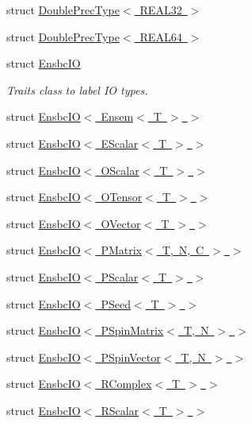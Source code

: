 \begin{DoxyCompactItemize}
struct \mbox{\hyperlink{structENSEM_1_1DoublePrecType_3_01REAL32_01_4}{Double\+Prec\+Type$<$ R\+E\+A\+L32 $>$}}
\item 
struct \mbox{\hyperlink{structENSEM_1_1DoublePrecType_3_01REAL64_01_4}{Double\+Prec\+Type$<$ R\+E\+A\+L64 $>$}}
\item 
struct \mbox{\hyperlink{structENSEM_1_1EnsbcIO}{Ensbc\+IO}}
\begin{DoxyCompactList}\small\item\em Traits class to label IO types. \end{DoxyCompactList}\item 
struct \mbox{\hyperlink{structENSEM_1_1EnsbcIO_3_01Ensem_3_01T_01_4_01_4}{Ensbc\+I\+O$<$ Ensem$<$ T $>$ $>$}}
\item 
struct \mbox{\hyperlink{structENSEM_1_1EnsbcIO_3_01EScalar_3_01T_01_4_01_4}{Ensbc\+I\+O$<$ E\+Scalar$<$ T $>$ $>$}}
\item 
struct \mbox{\hyperlink{structENSEM_1_1EnsbcIO_3_01OScalar_3_01T_01_4_01_4}{Ensbc\+I\+O$<$ O\+Scalar$<$ T $>$ $>$}}
\item 
struct \mbox{\hyperlink{structENSEM_1_1EnsbcIO_3_01OTensor_3_01T_01_4_01_4}{Ensbc\+I\+O$<$ O\+Tensor$<$ T $>$ $>$}}
\item 
struct \mbox{\hyperlink{structENSEM_1_1EnsbcIO_3_01OVector_3_01T_01_4_01_4}{Ensbc\+I\+O$<$ O\+Vector$<$ T $>$ $>$}}
\item 
struct \mbox{\hyperlink{structENSEM_1_1EnsbcIO_3_01PMatrix_3_01T_00_01N_00_01C_01_4_01_4}{Ensbc\+I\+O$<$ P\+Matrix$<$ T, N, C $>$ $>$}}
\item 
struct \mbox{\hyperlink{structENSEM_1_1EnsbcIO_3_01PScalar_3_01T_01_4_01_4}{Ensbc\+I\+O$<$ P\+Scalar$<$ T $>$ $>$}}
\item 
struct \mbox{\hyperlink{structENSEM_1_1EnsbcIO_3_01PSeed_3_01T_01_4_01_4}{Ensbc\+I\+O$<$ P\+Seed$<$ T $>$ $>$}}
\item 
struct \mbox{\hyperlink{structENSEM_1_1EnsbcIO_3_01PSpinMatrix_3_01T_00_01N_01_4_01_4}{Ensbc\+I\+O$<$ P\+Spin\+Matrix$<$ T, N $>$ $>$}}
\item 
struct \mbox{\hyperlink{structENSEM_1_1EnsbcIO_3_01PSpinVector_3_01T_00_01N_01_4_01_4}{Ensbc\+I\+O$<$ P\+Spin\+Vector$<$ T, N $>$ $>$}}
\item 
struct \mbox{\hyperlink{structENSEM_1_1EnsbcIO_3_01RComplex_3_01T_01_4_01_4}{Ensbc\+I\+O$<$ R\+Complex$<$ T $>$ $>$}}
\item 
struct \mbox{\hyperlink{structENSEM_1_1EnsbcIO_3_01RScalar_3_01T_01_4_01_4}{Ensbc\+I\+O$<$ R\+Scalar$<$ T $>$ $>$}}
\item 

\end{DoxyCompactItemize}
